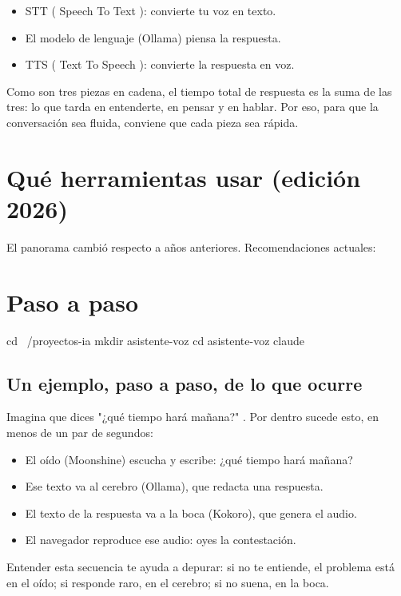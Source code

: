 \documentclass[11pt,a4paper]{book}
\begin{document}
\begin{itemize}\item STT ( Speech To Text ): convierte tu voz en texto.\end{itemize}
\begin{itemize}\item El modelo de lenguaje (Ollama) piensa la respuesta.\end{itemize}
\begin{itemize}\item TTS ( Text To Speech ): convierte la respuesta en voz.\end{itemize}
Como son tres piezas en cadena, el tiempo total de respuesta es la suma de las tres: lo que tarda en entenderte, en pensar y en hablar. Por eso, para que la conversación sea fluida, conviene que cada pieza sea rápida.

\section{Qué herramientas usar (edición 2026)}
El panorama cambió respecto a años anteriores. Recomendaciones actuales:

\section{Paso a paso}
\begin{codebox}
cd ~/proyectos-ia
mkdir asistente-voz
cd asistente-voz
claude
\end{codebox}
\subsection{Un ejemplo, paso a paso, de lo que ocurre}
Imagina que dices "¿qué tiempo hará mañana?" . Por dentro sucede esto, en menos de un par de segundos:

\begin{itemize}\item El oído (Moonshine) escucha y escribe: ¿qué tiempo hará mañana?\end{itemize}
\begin{itemize}\item Ese texto va al cerebro (Ollama), que redacta una respuesta.\end{itemize}
\begin{itemize}\item El texto de la respuesta va a la boca (Kokoro), que genera el audio.\end{itemize}
\begin{itemize}\item El navegador reproduce ese audio: oyes la contestación.\end{itemize}
Entender esta secuencia te ayuda a depurar: si no te entiende, el problema está en el oído; si responde raro, en el cerebro; si no suena, en la boca.
\end{document}
